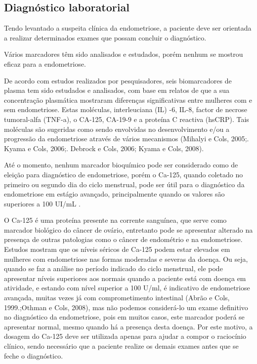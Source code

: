 \documentclass[12pt]{article} %
\begin{document}
\subsection{Diagnóstico laboratorial}

Tendo levantado a suspeita clínica da endometriose, a paciente deve ser orientada a realizar determinados exames que possam concluir o diagnóstico.

Vários marcadores têm sido analisados e estudados, porém nenhum se mostrou eficaz para a endometriose.

De acordo com estudos realizados por pesquisadores, seis biomarcadores de plasma tem sido estudados e analisados, com base em relatos  de que a sua concentração plasmática mostraram diferenças significativas entre mulheres com e sem endometriose. Estas moléculas, interleuciana (IL) -6, IL-8, factor de necrose tumoral-alfa (TNF-a), o CA-125, CA-19-9 e a proteína C reactiva (hsCRP). Tais moléculas são sugeridas como sendo envolvidas no desenvolvimento e/ou a progressão da endometriose através de vários mecanismos (Mihalyi e Cols, 2005;. Kyama e Cols, 2006;. Debrock e Cols, 2006; Kyama e Cols, 2008).

Até o momento, nenhum marcador
bioquímico pode ser considerado como de eleição para
diagnóstico de endometriose, porém o Ca-125, quando
coletado no primeiro ou segundo dia do ciclo menstrual, pode ser útil para o diagnóstico da endometriose em
estágio avançado, principalmente quando os valores são
superiores a 100 UI/mL .

O Ca-125 é uma proteína presente na corrente sanguínea, que serve como
marcador biológico do câncer de ovário, entretanto pode se apresentar alterado na presença de outras patologias como o câncer de endométrio e na endometriose. Estudos mostram que os níveis séricos de Ca-125 podem estar elevados em mulheres com endometriose nas formas moderadas e severas da doença. Ou seja, quando se faz a análise no período indicado do ciclo menstrual, ele pode apresentar níveis superiores aos normais quando a paciente está com doença em atividade, e estando com nível superior a 100 U/ml, é indicativo de endometriose avançada, muitas vezes já com comprometimento intestinal (Abrão e Cols, 1999.;Othman e Cols, 2008), mas não podemos considerá-lo um exame definitivo no diagnóstico da endometriose, pois em muitos casos, este marcador poderá se apresentar normal, mesmo quando há a presença desta doença. Por este motivo, a dosagem do Ca-125 deve ser utilizada apenas para ajudar a compor o raciocínio clínico, sendo necessário que a paciente realize os demais exames antes que se feche o diagnóstico.
\end{document}

